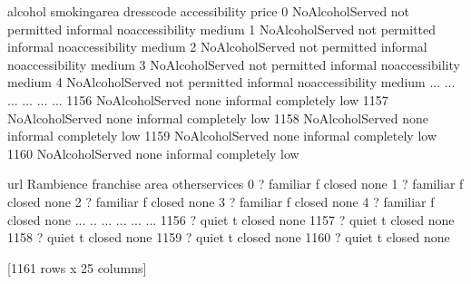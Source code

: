 \documentclass[letterpaper,10pt,english]{jupyterBook}
\begin{document}
\begin{sphinxVerbatim}[commandchars=\\\{\}]
                alcohol   smoking\PYGZus{}area dress\PYGZus{}code     accessibility   price  \PYGZbs{}
0     No\PYGZus{}Alcohol\PYGZus{}Served  not permitted   informal  no\PYGZus{}accessibility  medium   
1     No\PYGZus{}Alcohol\PYGZus{}Served  not permitted   informal  no\PYGZus{}accessibility  medium   
2     No\PYGZus{}Alcohol\PYGZus{}Served  not permitted   informal  no\PYGZus{}accessibility  medium   
3     No\PYGZus{}Alcohol\PYGZus{}Served  not permitted   informal  no\PYGZus{}accessibility  medium   
4     No\PYGZus{}Alcohol\PYGZus{}Served  not permitted   informal  no\PYGZus{}accessibility  medium   
...                 ...            ...        ...               ...     ...   
1156  No\PYGZus{}Alcohol\PYGZus{}Served           none   informal        completely     low   
1157  No\PYGZus{}Alcohol\PYGZus{}Served           none   informal        completely     low   
1158  No\PYGZus{}Alcohol\PYGZus{}Served           none   informal        completely     low   
1159  No\PYGZus{}Alcohol\PYGZus{}Served           none   informal        completely     low   
1160  No\PYGZus{}Alcohol\PYGZus{}Served           none   informal        completely     low   

     url Rambience franchise    area other\PYGZus{}services  
0      ?  familiar         f  closed           none  
1      ?  familiar         f  closed           none  
2      ?  familiar         f  closed           none  
3      ?  familiar         f  closed           none  
4      ?  familiar         f  closed           none  
...   ..       ...       ...     ...            ...  
1156   ?     quiet         t  closed           none  
1157   ?     quiet         t  closed           none  
1158   ?     quiet         t  closed           none  
1159   ?     quiet         t  closed           none  
1160   ?     quiet         t  closed           none  

[1161 rows x 25 columns]
\end{sphinxVerbatim}

\begin{sphinxVerbatim}[commandchars=\\\{\}]
  
\end{sphinxVerbatim}
\end{document}
